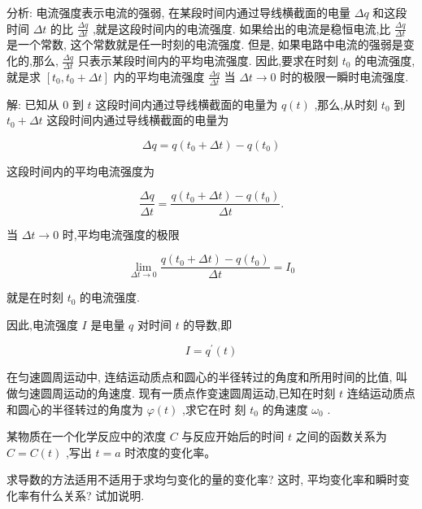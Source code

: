 \documentclass[lang=cn,newtx,10pt,scheme=chinese]{elegantbook}
\begin{document}
分析: 电流强度表示电流的强弱, 在某段时间内通过导线横截面的电量 \({\Delta q}\) 和这段时间 \({\Delta t}\) 的比 \(\frac{\Delta q}{\Delta t}\) ,就是这段时间内的电流强度. 如果给出的电流是稳恒电流,比 \(\frac{\Delta q}{\Delta t}\) 是一个常数, 这个常数就是任一时刻的电流强度. 但是, 如果电路中电流的强弱是变化的,那么, \(\frac{\Delta q}{\Delta t}\) 只表示某段时间内的平均电流强度. 因此,要求在时刻 \({t}_{0}\) 的电流强度,就是求 \(\left\lbrack {{t}_{0},{t}_{0} + {\Delta t}}\right\rbrack\) 内的平均电流强度 \(\frac{\Delta q}{\Delta t}\) 当 \({\Delta t} \rightarrow 0\) 时的极限一瞬时电流强度.

解: 已知从 0 到 \(t\) 这段时间内通过导线横截面的电量为 \(q\left( t\right)\) ,那么,从时刻 \({t}_{0}\) 到 \({t}_{0} + {\Delta t}\) 这段时间内通过导线横截面的电量为

\[
{\Delta q} = q\left( {{t}_{0} + {\Delta t}}\right) - q\left( {t}_{0}\right)
\]

这段时间内的平均电流强度为

\[
\frac{\Delta q}{\Delta t} = \frac{q\left( {{t}_{0} + {\Delta t}}\right) - q\left( {t}_{0}\right) }{\Delta t}.
\]

当 \({\Delta t} \rightarrow 0\) 时,平均电流强度的极限

\[
\mathop{\lim }\limits_{{{\Delta t} \rightarrow 0}}\frac{q\left( {{t}_{0} + {\Delta t}}\right) - q\left( {t}_{0}\right) }{\Delta t} = {I}_{0}
\]

就是在时刻 \({t}_{0}\) 的电流强度.

因此,电流强度 \(I\) 是电量 \(q\) 对时间 \(t\) 的导数,即

\[
I = {q}^{\prime }\left( t\right)
\]

\begin{problemset}[练习]

\item 在匀速圆周运动中, 连结运动质点和圆心的半径转过的角度和所用时间的比值, 叫做匀速圆周运动的角速度. 现有一质点作变速圆周运动,已知在时刻 \(t\) 连结运动质点和圆心的半径转过的角度为 \(\varphi \left( t\right)\) ,求它在时 刻 \({t}_{0}\) 的角速度 \({\omega }_{0}\) .

\item 某物质在一个化学反应中的浓度 \(C\) 与反应开始后的时间 \(t\) 之间的函数关系为 \(C = C\left( t\right)\) ,写出 \(t = a\) 时浓度的变化率。

\item 求导数的方法适用不适用于求均匀变化的量的变化率? 这时, 平均变化率和瞬时变化率有什么关系? 试加说明.

\end{problemset}
\end{document}
